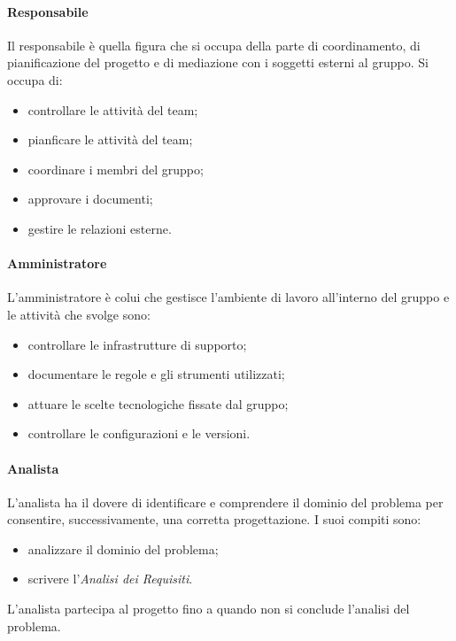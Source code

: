 \paragraph{Responsabile} \hfill \break
Il responsabile è quella figura che si occupa della parte di coordinamento, di pianificazione del progetto 
e di mediazione con i soggetti esterni al gruppo. Si occupa di:
\begin{itemize}
    \item controllare le attività del team;
    \item pianficare le attività del team;
    \item coordinare i membri del gruppo;
    \item approvare i documenti;
    \item gestire le relazioni esterne.
\end{itemize}

\paragraph{Amministratore} \hfill \break
L'amministratore è colui che gestisce l'ambiente di lavoro all'interno del gruppo e le attività che svolge sono:
\begin{itemize}
    \item controllare le infrastrutture di supporto;
    \item documentare le regole e gli strumenti utilizzati;
    \item attuare le scelte tecnologiche fissate dal gruppo;
    \item controllare le configurazioni e le versioni.
\end{itemize}

\paragraph{Analista} \hfill \break
L'analista ha il dovere di identificare e comprendere il dominio del problema per consentire, successivamente,
una corretta progettazione. I suoi compiti sono:
\begin{itemize}
    \item analizzare il dominio del problema;
    \item scrivere l'\emph{Analisi dei Requisiti}.
\end{itemize}
L'analista partecipa al progetto fino a quando non si conclude l'analisi del problema.

